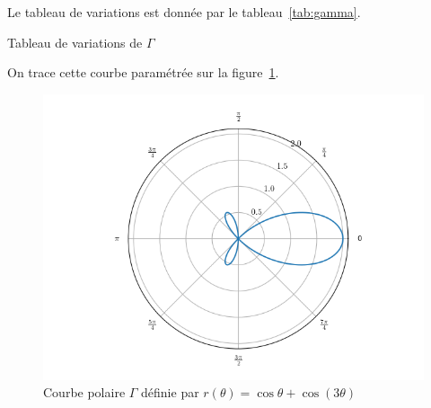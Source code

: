 Le tableau de variations est donnée par le tableau~\ref{tab:gamma}.

\begin{table}
    \centering   
    \caption{Tableau de variations de $\Gamma$}
    \label{tab:gamma}
\end{table}

On trace cette courbe paramétrée sur la figure~\ref{fig:pol}.
\begin{figure}
 \centering
 \includegraphics[scale=0.85]{courbepolaire.png}
 \caption{Courbe polaire $\Gamma$ définie par \(r(\theta)=\cos\theta+\cos(3\theta)\)}
 \label{fig:pol}
\end{figure}
